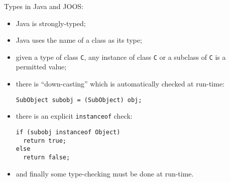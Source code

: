 \begin{slide*}
Types in Java and JOOS:
\begin{itemize}
\item Java is strongly-typed;
\item
Java uses the name of a class as its type;
\item
given a type of class {\tt C}, any instance
      of class {\tt C} or a subclass of {\tt C} is a permitted value;
\item
there is ``down-casting'' which is automatically checked at
run-time:

\begin{scriptsize}
\begin{verbatim}
SubObject subobj = (SubObject) obj; 
\end{verbatim}
\end{scriptsize}

\item
there is an explicit {\tt instanceof} check:

\begin{scriptsize}
\begin{verbatim}
if (subobj instanceof Object) 
  return true; 
else
  return false;
\end{verbatim}
\end{scriptsize}

\item
and finally some type-checking must be done at run-time.
\end{itemize}
\vfil
\end{slide*}

